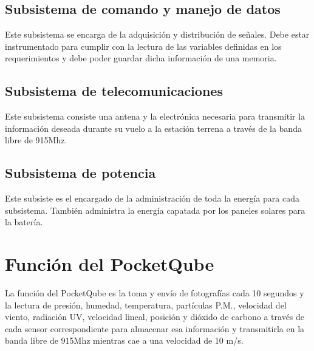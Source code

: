 \documentclass{article}%
\begin{document}
\subsection{Subsistema de comando y manejo de datos}
\justify
Este subsistema se encarga de la adquisición y distribución de señales. Debe estar instrumentado para cumplir con la lectura de 
las variables definidas en los requerimientos y debe poder guardar dicha información de una memoria.
\subsection{Subsistema de telecomunicaciones}
\justify
Este subsistema consiste una antena y la electrónica necesaria para transmitir la información deseada durante su vuelo a la estación terrena 
a través de la banda libre de 915Mhz.
\subsection{Subsistema de potencia}
\justify
Este subsiste es el encargado de la administración de toda la energía para cada subsistema. También administra la energía capatada por los paneles 
solares para la batería.
\section{Función del PocketQube}
\justify
La función del PocketQube es la toma y envío de fotografías cada 10 segundos y la lectura de presión, humedad, temperatura, partículas P.M., velocidad del viento, radiación UV, velocidad lineal, posición
y dióxido de carbono a través de cada sensor correspondiente para almacenar esa información y transmitirla en la banda libre de 915Mhz mientras cae a una velocidad de 
10 m/s.
\end{document}
